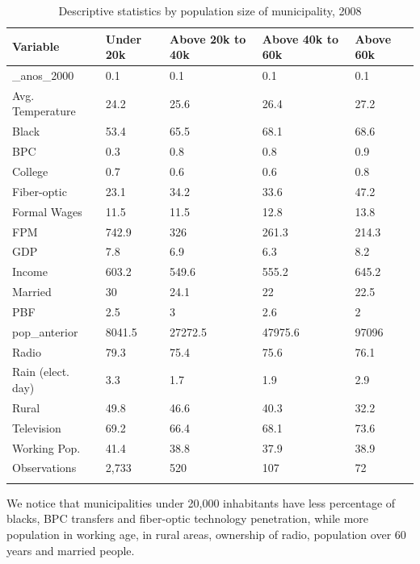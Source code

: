 \documentclass[
  12pt,
]{article}
\begin{document}
\begin{table}[!h]

\caption{\label{tab:desc.2008}Descriptive statistics by population size of municipality, 2008}
\centering
\fontsize{9}{11}\selectfont
\begin{tabu} to 
\toprule
Variable & Under 20k & Above 20k to 40k & Above 40k to 60k & Above 60k\\
\_anos\_2000 & 0.1 & 0.1 & 0.1 & 0.1\\
Avg. Temperature & 24.2 & 25.6 & 26.4 & 27.2\\
Black & 53.4 & 65.5 & 68.1 & 68.6\\
BPC & 0.3 & 0.8 & 0.8 & 0.9\\
College & 0.7 & 0.6 & 0.6 & 0.8\\
Fiber-optic & 23.1 & 34.2 & 33.6 & 47.2\\
Formal Wages & 11.5 & 11.5 & 12.8 & 13.8\\
FPM & 742.9 & 326 & 261.3 & 214.3\\
GDP & 7.8 & 6.9 & 6.3 & 8.2\\
Income & 603.2 & 549.6 & 555.2 & 645.2\\
Married & 30 & 24.1 & 22 & 22.5\\
PBF & 2.5 & 3 & 2.6 & 2\\
pop\_anterior & 8041.5 & 27272.5 & 47975.6 & 97096\\
Radio & 79.3 & 75.4 & 75.6 & 76.1\\
Rain (elect. day) & 3.3 & 1.7 & 1.9 & 2.9\\
Rural & 49.8 & 46.6 & 40.3 & 32.2\\
Television & 69.2 & 66.4 & 68.1 & 73.6\\
Working Pop. & 41.4 & 38.8 & 37.9 & 38.9\\
Observations & 2,733 & 520 & 107 & 72\\
\bottomrule
{}\\
\end{tabu}
\end{table}

We notice that municipalities under 20,000 inhabitants have less
percentage of blacks, BPC transfers and fiber-optic technology
penetration, while more population in working age, in rural areas,
ownership of radio, population over 60 years and married people.
\end{document}
